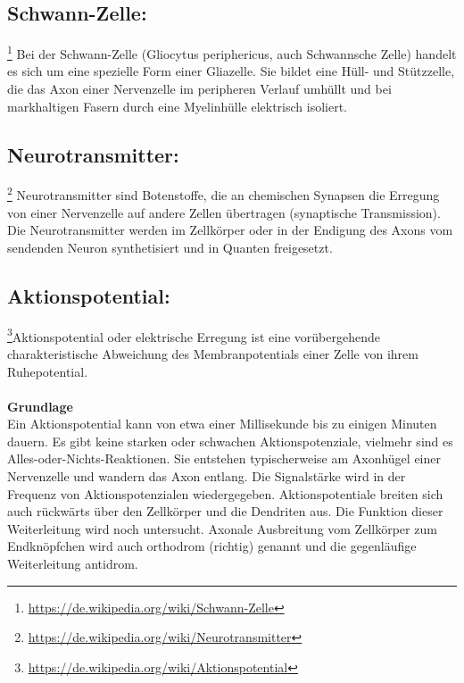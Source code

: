 \subsection{Schwann-Zelle:}\footnote{\url{https://de.wikipedia.org/wiki/Schwann-Zelle}}
Bei der Schwann-Zelle (Gliocytus periphericus, auch Schwannsche Zelle) handelt es sich um eine spezielle Form einer Gliazelle. Sie bildet eine Hüll- und Stützzelle, die das Axon einer Nervenzelle im peripheren Verlauf umhüllt und bei markhaltigen Fasern durch eine Myelinhülle elektrisch isoliert.

\subsection{Neurotransmitter:}\footnote{\url{https://de.wikipedia.org/wiki/Neurotransmitter}} Neurotransmitter sind Botenstoffe, die an chemischen Synapsen die Erregung von einer Nervenzelle auf andere Zellen übertragen (synaptische Transmission). Die Neurotransmitter werden im Zellkörper oder in der Endigung des Axons vom sendenden Neuron synthetisiert und in Quanten freigesetzt.

\subsection{Aktionspotential:}\footnote{\url{https://de.wikipedia.org/wiki/Aktionspotential}}Aktionspotential oder elektrische Erregung ist eine vorübergehende charakteristische Abweichung des Membranpotentials einer Zelle von ihrem Ruhepotential.
\\\\
\textbf{Grundlage}\\
Ein Aktionspotential kann von etwa einer Millisekunde bis zu einigen Minuten dauern. Es gibt keine starken oder schwachen Aktionspotenziale, vielmehr sind es Alles-oder-Nichts-Reaktionen. Sie entstehen typischerweise am Axonhügel einer Nervenzelle und wandern das Axon entlang. Die Signalstärke wird in der Frequenz von Aktionspotenzialen wiedergegeben. Aktionspotentiale breiten sich auch rückwärts über den Zellkörper und die Dendriten aus. Die Funktion dieser Weiterleitung wird noch untersucht. Axonale Ausbreitung vom Zellkörper zum Endknöpfchen wird auch orthodrom (richtig) genannt und die gegenläufige Weiterleitung antidrom.

